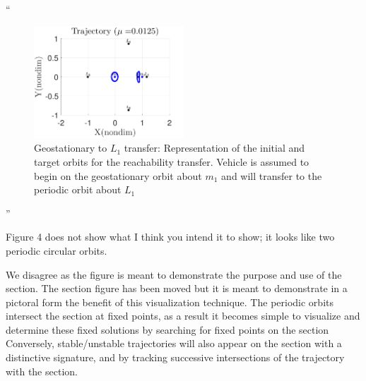 \documentclass[11pt]{article}
\newenvironment{correction}{\begin{list}{}{\setlength{\leftmargin}{1cm}\setlength{\rightmargin}{1cm}}\vspace{\parsep}\item[]``}{''\end{list}}
\begin{document}
\begin{enumerate}
\begin{correction}
\begin{figure}[H]
   \centering
   \includegraphics[width=0.5\textwidth]{initial_final} %
   \caption{Geostationary to \( L_1 \) transfer: Representation of the initial and target orbits for the reachability transfer. 
   Vehicle is assumed to begin on the geostationary orbit about \( m_1\) and will transfer to the periodic orbit about \( L_1\)}
\end{figure}
\end{correction}
\item
    \begin{itshape}
Figure 4 does not show what I think you intend it to show; it looks like two periodic circular orbits.
\end{itshape}

We disagree as the figure is meant to demonstrate the purpose and use of the \Poincare section.
The \Poincare section figure has been moved but it is meant to demonstrate in a pictoral form the benefit of this visualization technique.
The periodic orbits intersect the section at fixed points, as a result it becomes simple to visualize and determine these fixed solutions by searching for fixed points on the section
Conversely, stable/unstable trajectories will also appear on the section with a distinctive signature, and by tracking successive intersections of the trajectory with the \Poincare section.


\end{enumerate}
\end{document}
